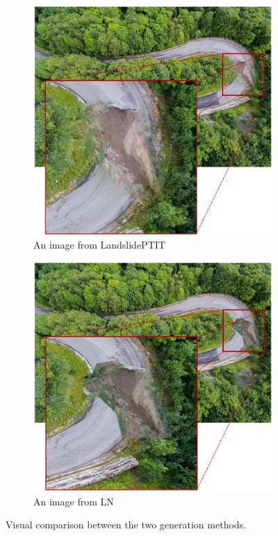 \documentclass{ieeeaccess}
\begin{document}
\begin{figure}
    \begin{subfigure}[b]{0.47\linewidth}        %
        \centering
        \includegraphics[width=\linewidth]{Fig/LB.png}
        \caption{An image from LandslidePTIT}
        \label{fig:LB}
    \end{subfigure}
    \hfill
    \begin{subfigure}[b]{0.47\linewidth}        %
        \centering
        \includegraphics[width=\linewidth]{Fig/LN.png}
        \caption{An image from LN}
        \label{fig:LN}
    \end{subfigure}
    \caption{Visual comparison between the two generation methods.}
    \label{fig:LBvsLN}
\end{figure}
\end{document}
